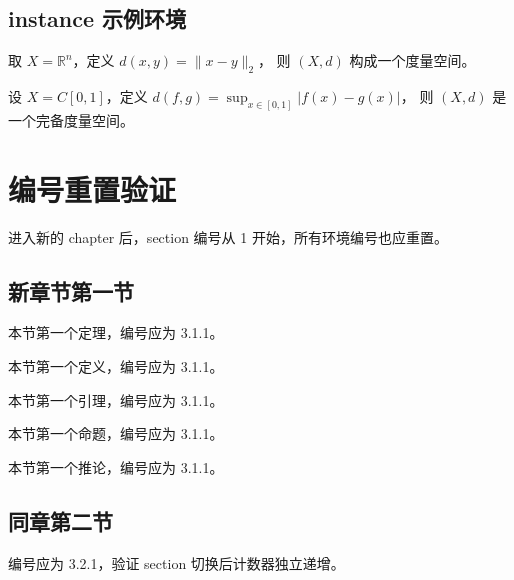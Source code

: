 \documentclass[12pt,a4paper]{ctexbook}
\begin{document}
\section{instance 示例环境}

\begin{instance}[度量空间]
取 $X=\mathbb{R}^n$，定义 $d(x,y)=\|x-y\|_2$，
则 $(X,d)$ 构成一个度量空间。
\end{instance}

\begin{instance}
设 $X=C[0,1]$，定义 $d(f,g)=\sup_{x\in[0,1]}|f(x)-g(x)|$，
则 $(X,d)$ 是一个完备度量空间。
\end{instance}

\chapter{编号重置验证}

进入新的 chapter 后，section 编号从 1 开始，所有环境编号也应重置。

\section{新章节第一节}

\begin{theorem}
本节第一个定理，编号应为 3.1.1。
\end{theorem}

\begin{definition}
本节第一个定义，编号应为 3.1.1。
\end{definition}

\begin{lemma}
本节第一个引理，编号应为 3.1.1。
\end{lemma}

\begin{proposition}
本节第一个命题，编号应为 3.1.1。
\end{proposition}

\begin{corollary}
本节第一个推论，编号应为 3.1.1。
\end{corollary}

\section{同章第二节}

\begin{theorem}[第二节定理]
编号应为 3.2.1，验证 section 切换后计数器独立递增。
\end{theorem}
\end{document}
